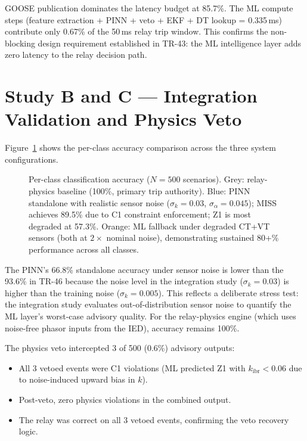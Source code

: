 \documentclass[11pt,a4paper]{article}
\begin{document}
\medskip\noindent
GOOSE publication dominates the latency budget at 85.7\%.  The ML compute
steps (feature extraction + PINN + veto + EKF + DT lookup = 0.335\,ms)
contribute only 0.67\% of the 50\,ms relay trip window.  This confirms
the non-blocking design requirement established in TR-43: the ML intelligence
layer adds zero latency to the relay decision path.

\section{Study B and C --- Integration Validation and Physics Veto}
\label{sec:studyBC}

Figure~\ref{fig:accuracy} shows the per-class accuracy comparison across the
three system configurations.

\begin{figure}[htbp]
  \centering
  \resizebox{0.96\textwidth}{!}{}
  \caption{Per-class classification accuracy ($N=500$ scenarios).  Grey:
           relay-physics baseline (100\%, primary trip authority).  Blue:
           PINN standalone with realistic sensor noise ($\sigma_k=0.03$,
           $\sigma_\alpha=0.045$); MISS achieves 89.5\% due to C1 constraint
           enforcement; Z1 is most degraded at 57.3\%.  Orange: ML fallback
           under degraded CT+VT sensors (both at $2\times$ nominal noise),
           demonstrating sustained 80+\% performance across all classes.}
  \label{fig:accuracy}
\end{figure}

\noindent
The PINN's 66.8\% standalone accuracy under sensor noise is lower than
the 93.6\% in TR-46 because the noise level in the integration study
($\sigma_k=0.03$) is higher than the training noise ($\sigma_k=0.005$).
This reflects a deliberate stress test: the integration study evaluates
out-of-distribution sensor noise to quantify the ML layer's worst-case
advisory quality.  For the relay-physics engine (which uses noise-free
phasor inputs from the IED), accuracy remains 100\%.

The physics veto intercepted 3 of 500 (0.6\%) advisory outputs:
\begin{itemize}
  \item All 3 vetoed events were C1 violations (ML predicted Z1 with
    $k_\mathrm{ibr}<0.06$ due to noise-induced upward bias in $k$).
  \item Post-veto, zero physics violations in the combined output.
  \item The relay was correct on all 3 vetoed events, confirming the
    veto recovery logic.
\end{itemize}
\end{document}

